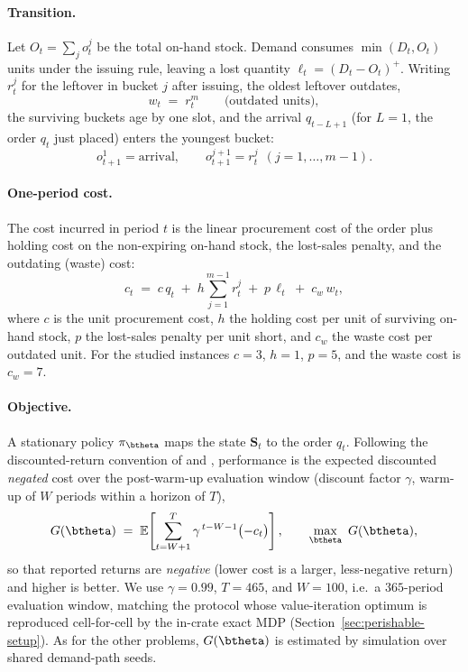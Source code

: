 \paragraph{Transition.}
Let $O_t=\sum_{j}o^{j}_t$ be the total on-hand stock. Demand consumes $\min(D_t,O_t)$ units under the
issuing rule, leaving a lost quantity $\ell_t=(D_t-O_t)^+$. Writing $r^{j}_t$ for the leftover in
bucket $j$ after issuing, the oldest leftover outdates,
\begin{equation*}
    w_t \;=\; r^{m}_t \qquad\text{(outdated units)},
\end{equation*}
the surviving buckets age by one slot, and the arrival $q_{t-L+1}$ (for $L=1$, the order $q_t$ just
placed) enters the youngest bucket:
\begin{equation*}
    o^{1}_{t+1}=\text{arrival},\qquad o^{j+1}_{t+1}=r^{j}_t\ \ (j=1,\dots,m-1).
\end{equation*}

\paragraph{One-period cost.}
The cost incurred in period $t$ is the linear procurement cost of the order plus holding cost on the
non-expiring on-hand stock, the lost-sales penalty, and the outdating (waste) cost:
\begin{equation}
    \label{eq:perish-cost}
    c_t \;=\; c\,q_t \;+\; h\sum_{j=1}^{m-1} r^{j}_t \;+\; p\,\ell_t \;+\; c_w\,w_t ,
\end{equation}
where $c$ is the unit procurement cost, $h$ the holding cost per unit of surviving on-hand stock, $p$
the lost-sales penalty per unit short, and $c_w$ the waste cost per outdated unit. For the studied
instances $c=3$, $h=1$, $p=5$, and the waste cost is $c_w=7$.

\paragraph{Objective.}
A stationary policy $\pi_{\btheta}$ maps the state $\mathbf{S}_t$ to the order $q_t$. Following the
discounted-return convention of \citet{deMoor2022perishable} and \citet{farrington2025perishable},
performance is the expected discounted \emph{negated} cost over the post-warm-up evaluation window
(discount factor $\gamma$, warm-up of $W$ periods within a horizon of $T$),
\begin{equation}
    \label{eq:perish-objective}
    G(\btheta) \;=\; \mathbb{E}\!\left[\sum_{t=W+1}^{T}\gamma^{\,t-W-1}\bigl(-c_t\bigr)\right],
    \qquad \max_{\btheta}\ G(\btheta),
\end{equation}
so that reported returns are \emph{negative} (lower cost is a larger, less-negative return) and higher
is better. We use $\gamma=0.99$, $T=465$, and $W=100$, i.e.\ a $365$-period evaluation window,
matching the protocol whose value-iteration optimum is reproduced cell-for-cell by the in-crate exact
MDP (Section~\ref{sec:perishable-setup}). As for the other problems, $G(\btheta)$ is estimated by
simulation over shared demand-path seeds.

